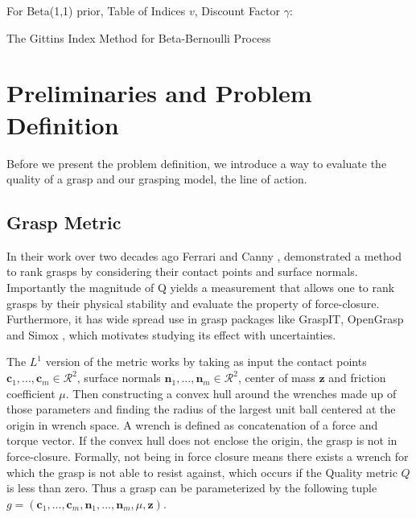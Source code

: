 \documentclass[letterpaper, 10 pt, conference]{ieeeconf}  %
\begin{document}
\begin{algorithm}
 For Beta(1,1) prior, Table of Indices $v$, Discount Factor $\gamma$: \\
 \caption{The Gittins Index Method for Beta-Bernoulli Process}
\end{algorithm}



\section{Preliminaries and Problem Definition}
Before we present the problem definition, we introduce a way to evaluate the quality of a grasp and our grasping model, the line of action.

\subsection{Grasp Metric}
In their work over two decades ago Ferrari and Canny \cite{ferrari1992}, demonstrated a method to rank grasps by considering their contact points and surface normals. Importantly the magnitude of Q yields a measurement that allows one to rank grasps by their physical stability and evaluate the property of force-closure. Furthermore, it has wide spread use in grasp packages like GraspIT\cite{miller2004graspit}, OpenGrasp\cite{73} and Simox \cite{vahrenkamp2010simo}, which motivates studying its effect with uncertainties. 

The $L^1$ version of the metric works by taking as input the contact points $\textbf{c}_1,...,\textbf{c}_m \in \mathcal{R}^2$, surface normals $\textbf{n}_1,...,\textbf{n}_m \in \mathcal{R}^2$, center of mass $\textbf{z}$ and friction coefficient $\mu$. Then constructing a convex hull around the wrenches made up of those parameters and finding the radius of the largest unit ball centered at the origin in wrench space. A wrench is defined as concatenation of a force and torque vector.  If the convex hull does not enclose the origin, the grasp is not in force-closure. Formally, not being in force closure means there exists a wrench for which the grasp is not able to resist against, which occurs if the Quality metric $Q$ is less than zero. Thus a grasp can be parameterized by the following tuple $g = ( \textbf{c}_1,...,\textbf{c}_m,\textbf{n}_1,...,\textbf{n}_m,\mu, \textbf{z} )$.
\end{document}
